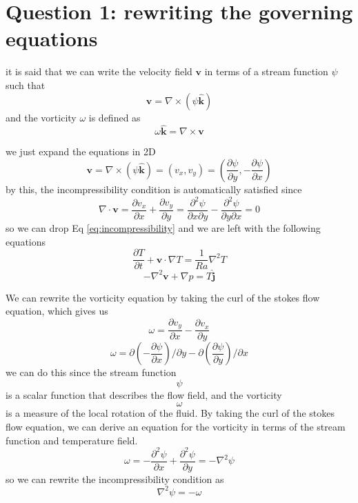 \documentclass[12pt]{article}
\begin{document}
\section{Question 1: rewriting the governing equations}

it is said that we can write the velocity field $\mathbf{v}$ in terms of a stream function $\psi$ such that
\begin{equation}
    \mathbf{v} = \nabla \times (\psi \hat{\mathbf{k}})
\end{equation}
and the vorticity $\omega$ is defined as
\begin{equation}
    \omega \hat{\mathbf{k}} = \nabla \times \mathbf{v}
\end{equation}

we just expand the equations in 2D
\begin{equation}
    \mathbf{v} = \nabla \times (\psi \hat{\mathbf{k}}) = (v_x, v_y) = \left( \dfrac{\partial \psi}{\partial y}, -\dfrac{\partial \psi}{\partial x} \right)
\end{equation}
by this, the incompressibility condition is automatically satisfied since
\begin{equation}
    \nabla \cdot \mathbf{v} = \dfrac{\partial v_x}{\partial x} + \dfrac{\partial v_y}{\partial y} = \dfrac{\partial^2 \psi}{\partial x \partial y} - \dfrac{\partial^2 \psi}{\partial y \partial x} = 0
\end{equation}
so we can drop Eq \ref{eq:incompressibility} and we are left with the following equations
\begin{equation}
    \boxed{\dfrac{\partial T}{\partial t} + \mathbf{v} \cdot \nabla T = \dfrac{1}{Ra}\nabla^2 T}
\end{equation}
\begin{equation}
    - \nabla^2 \mathbf{v} + \nabla p = T \mathbf {\hat{j} } 
\end{equation}


We can rewrite the vorticity equation by taking the curl of the stokes flow equation, which gives us
\begin{equation}
  \omega = \dfrac{\partial v_y}{\partial x} - \dfrac{\partial v_x}{\partial y} 
\end{equation}
\begin{equation}
   \omega  = \partial(- \dfrac{\partial \psi}{\partial x})/\partial y - \partial (\dfrac{\partial \psi}{\partial y})/\partial x 
\end{equation}
we can do this since the stream function $$\psi$$ is a scalar function that describes the flow field, and the vorticity $$\omega$$ is a measure of the local rotation of the fluid. By taking the curl of the stokes flow equation, we can derive an equation for the vorticity in terms of the stream function and temperature field.
\begin{equation}
\omega =  - \dfrac{\partial^2 \psi}{\partial x} + \dfrac{\partial^2 \psi}{\partial y } = - \nabla^2 \psi
\end{equation}
so we can rewrite the  incompressibility condition as
\begin{equation}
    \boxed{\nabla^2 \psi = - \omega}
\end{equation}
\end{document}
